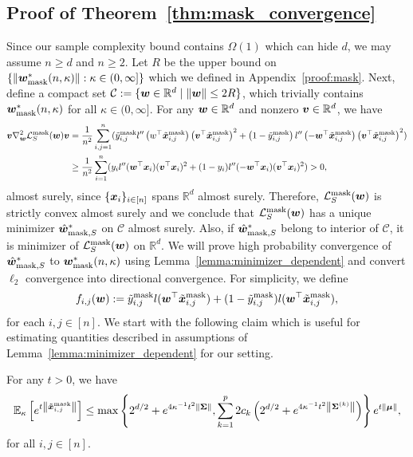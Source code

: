\subsection{Proof of Theorem~\ref{thm:mask_convergence}}\label{proof:mask_convergence}
Since our sample complexity bound contains $\Omega (1)$ which can hide $d$, we may assume $n \geq d$ and $n \geq 2$. 
Let $R$ be the upper bound on $\{ \lVert {\bm{w}}^*_\mathrm{mask}(n,\kappa) \rVert : \kappa \in (0,\infty] \}$ which we defined in Appendix~\ref{proof:mask}. Next, define a compact set $\mathcal{C}:= \{{\bm{w}} \in \mathbb{R}^d \mid \lVert {\bm{w}} \rVert \leq 2R\}$, which trivially contains ${\bm{w}}^*_\mathrm{mask}(n,\kappa)$ for all $\kappa \in (0, \infty]$. For any ${\bm{w}}\in \mathbb{R}^d$ and nonzero ${\bm{v}} \in \mathbb{R}^d$, we have
\begin{align*}
    {\bm{v}} \nabla^2_{\bm{w}} \mathcal{L}_S^\mathrm{mask} ({\bm{w}}) {\bm{v}} &= \frac{1}{n^2} \sum_{i,j=1}^n (\tilde{y}_{i,j}^\mathrm{mask} l''\left(w^\top \tilde{{\bm{x}}}_{i,j}^\mathrm{mask}\right)\left({\bm{v}}^\top \tilde{{\bm{x}}}_{i,j}^\mathrm{mask}\right)^2 +  \left(1-\tilde{y}_{i,j}^\mathrm{mask}\right)l''\left(-{\bm{w}}^\top \tilde{{\bm{x}}}_{i,j}^\mathrm{mask}\right)\left({\bm{v}}^\top \tilde{{\bm{x}}}_{i,j}^\mathrm{mask}\right)^2)\\
    &\geq\frac{1}{n^2} \sum_{i=1}^n (y_i l''({\bm{w}}^\top {\bm{x}}_i)({\bm{v}}^\top {\bm{x}}_i)^2 +  (1-y_i)l''(-{\bm{w}}^\top {\bm{x}}_i)({\bm{v}}^\top {\bm{x}}_i)^2)>0,
\end{align*}
almost surely, since $\{{\bm{x}}_i\}_{i \in [n]}$ spans $\mathbb{R}^d$ almost surely. Therefore, $\mathcal{L}_S^\mathrm{mask} ({\bm{w}})$ is strictly convex almost surely and we conclude that $\mathcal{L}_S^\mathrm{mask}({\bm{w}})$ has a unique minimizer $\hat{{\bm{w}}}_{\mathrm{mask}, S}^*$ on $\mathcal{C}$ almost surely. Also, if $\hat{{\bm{w}}}_{\mathrm{mask},S}^*$ belong to interior of $\mathcal{C}$, it is minimizer of $\mathcal{L}_S^\mathrm{mask}({\bm{w}})$ on $\mathbb{R}^d$. We will prove high probability convergence of $\hat{{\bm{w}}}_{\mathrm{mask}, S}^*$ to ${\bm{w}}^*_\mathrm{mask}(n,\kappa)$ using Lemma~\ref{lemma:minimizer_dependent} and convert $\ell_2$ convergence into directional convergence.  For simplicity, we define
\begin{equation*}
f_{i,j}({\bm{w}}) : = \tilde{y}_{i,j}^\mathrm{mask}l({\bm{w}}^\top \tilde{{\bm{x}}}_{i,j}^\mathrm{mask}) + (1-\tilde{y}_{i,j}^\mathrm{mask}) l({\bm{w}}^\top \tilde{{\bm{x}}}_{i,j}^\mathrm{mask}),
\end{equation*}
for each $i,j \in [n]$.
We start with the following claim which is useful for estimating quantities described in assumptions of Lemma~\ref{lemma:minimizer_dependent} for our setting.
\begin{claim}\label{claim:mask}
For any  $t>0$, we have
\begin{equation*}
\mathbb{E}_\kappa \left[ e^{t \left \lVert \tilde{{\bm{x}}}_{i,j}^\mathrm{mask}\right \rVert} \right] \leq \max \left \{  2^{d/2} + e^{4\kappa^{-1}t^2 \lVert {\bm{\Sigma}} \rVert} ,  \sum_{k=1}^p 2c_k \left(2^{d/2} + e^{4\kappa^{-1} t^2 \left \lVert {\bm{\Sigma}}^{(k)} \right \rVert} \right)  \right \}e^{t\lVert {\bm{\mu}} \rVert} ,
\end{equation*}
for all $i,j \in [n]$.
\end{claim}

